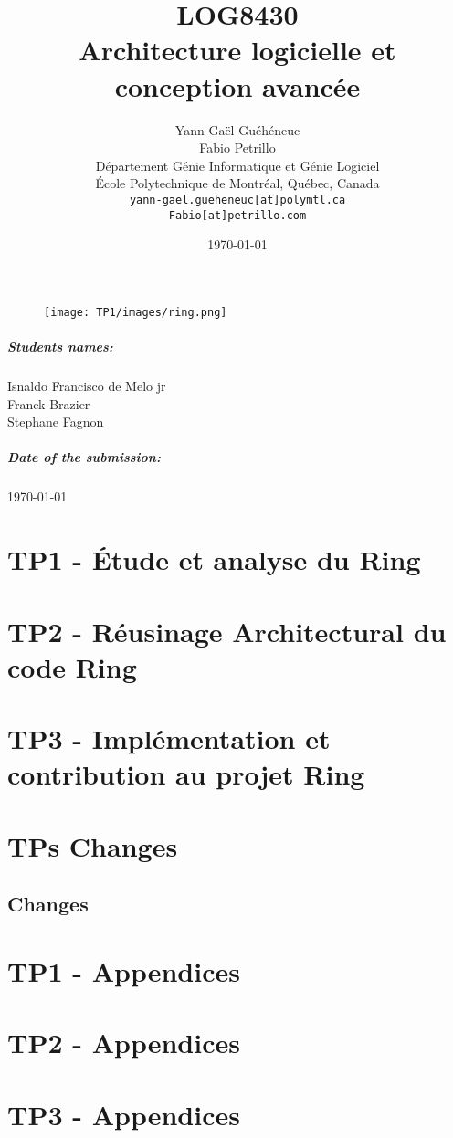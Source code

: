 \documentclass[11pt]{report}
\title{LOG8430\\Architecture logicielle et conception avanc\'{e}e}
\author{
    Yann-Gaël Guéhéneuc \\
    Fabio Petrillo \\
    D\'{e}partement G\'{e}nie Informatique et G\'{e}nie Logiciel \\
    \'{E}cole Polytechnique de Montr\'{e}al, Qu\'{e}bec, Canada \\
    \texttt{yann-gael.gueheneuc[at]polymtl.ca} \\
    \texttt{Fabio[at]petrillo.com}
}
\date{\today}
\def\auteur{}
\begin{document}
{\let\newpage\relax\maketitle}
\begin{figure}[ht!]
\centering
\texttt{[image: TP1/images/ring.png]}
\end{figure}

\paragraph{Students names:}
\centering
\paragraph{} \auteur
Isnaldo Francisco de Melo jr\\
Franck Brazier\\
Stephane Fagnon\\

\centering

\paragraph{Date of the submission:}
\today
\newpage

\tableofcontents

\raggedright
\chapter{TP1 - Étude et analyse du Ring }

\newpage
\chapter{TP2 - Réusinage Architectural du code Ring}

\newpage
\chapter{TP3 - Implémentation et contribution au projet Ring }



\appendix
\chapter{TPs Changes}
\section{Changes}

\chapter{TP1 - Appendices}

\chapter{TP2 - Appendices}

\chapter{TP3 - Appendices}



\printbibliography
\end{document}
